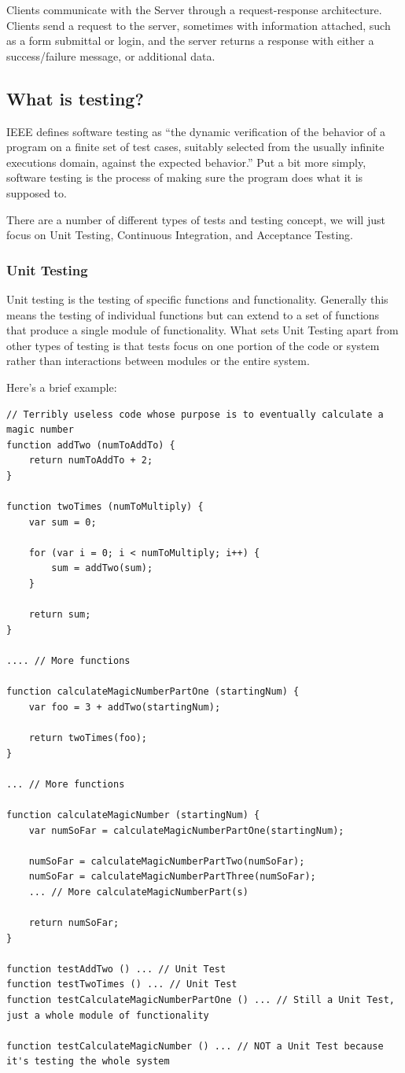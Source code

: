 \documentclass[11pt]{article}
\begin{document}
Clients communicate with the Server through a request-response architecture. Clients send a request to the server, sometimes with information attached, such as a form submittal or login, and the server returns a response with either a success/failure message, or additional data.


\subsection{What is testing?}
IEEE defines software testing as ``the dynamic verification of the behavior of a program on a finite set of test cases, suitably selected from the usually infinite executions domain, against the expected behavior.'' \cite{TestingDefinition} Put a bit more simply, software testing is the process of making sure the program does what it is supposed to.

There are a number of different types of tests and testing concept, we will just focus on Unit Testing, Continuous Integration, and Acceptance Testing.

\subsubsection{Unit Testing}
Unit testing is the testing of specific functions and functionality. Generally this means the testing of individual functions but can extend to a set of functions that produce a single module of functionality. What sets Unit Testing apart from other types of testing is that tests focus on one portion of the code or system rather than interactions between modules or the entire system.

Here's a brief example:
\begin{lstlisting}
// Terribly useless code whose purpose is to eventually calculate a magic number
function addTwo (numToAddTo) {
	return numToAddTo + 2;
}

function twoTimes (numToMultiply) {
	var sum = 0;

	for (var i = 0; i < numToMultiply; i++) {
		sum = addTwo(sum);
	}

	return sum;
}

.... // More functions

function calculateMagicNumberPartOne (startingNum) {
	var foo = 3 + addTwo(startingNum);

	return twoTimes(foo);
}

... // More functions

function calculateMagicNumber (startingNum) {
	var numSoFar = calculateMagicNumberPartOne(startingNum);

	numSoFar = calculateMagicNumberPartTwo(numSoFar);
	numSoFar = calculateMagicNumberPartThree(numSoFar);
	... // More calculateMagicNumberPart(s)

	return numSoFar;
}

function testAddTwo () ... // Unit Test
function testTwoTimes () ... // Unit Test
function testCalculateMagicNumberPartOne () ... // Still a Unit Test, just a whole module of functionality

function testCalculateMagicNumber () ... // NOT a Unit Test because it's testing the whole system
\end{lstlisting}
\end{document}
